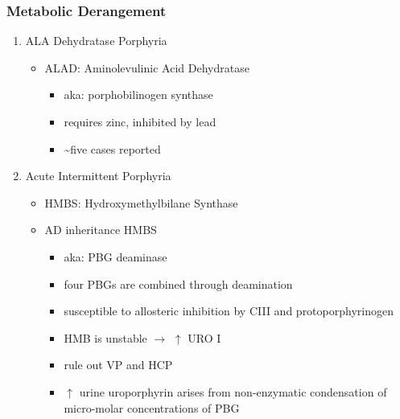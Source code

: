 \documentclass{scrartcl}
\begin{document}
\subsubsection{Metabolic Derangement}
\label{sec:orgd1616d5}
\begin{enumerate}
\item ALA Dehydratase Porphyria
\label{sec:org47218da}
\begin{itemize}
\item ALAD: Aminolevulinic Acid Dehydratase
\begin{itemize}
\item aka: porphobilinogen synthase
\item requires zinc, inhibited by lead
\item \textasciitilde{}five cases reported
\end{itemize}
\end{itemize}

\item Acute Intermittent Porphyria
\label{sec:orgdb726fe}
\begin{itemize}
\item HMBS: Hydroxymethylbilane Synthase
\item AD inheritance HMBS
\begin{itemize}
\item aka: PBG deaminase
\item four PBGs are combined through deamination
\item susceptible to allosteric inhibition by CIII and protoporphyrinogen
\item HMB is unstable \(\to\) \(\uparrow\) URO I
\item rule out VP and HCP
\item \(\uparrow\) urine uroporphyrin arises from non-enzymatic
condensation of micro-molar concentrations of PBG
\end{itemize}
\end{itemize}


\end{enumerate}
\end{document}
